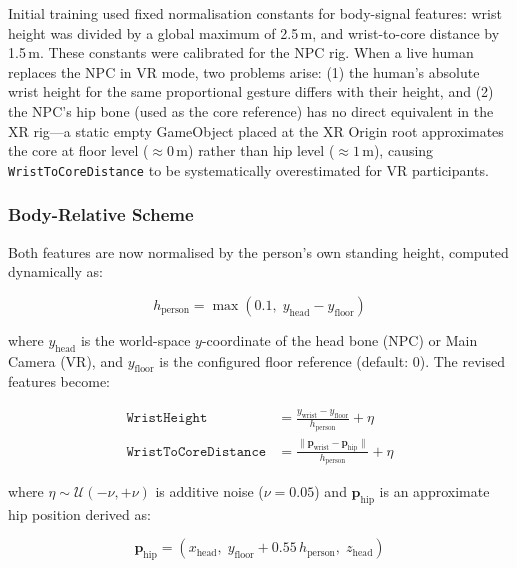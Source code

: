 \documentclass[../report.tex]{subfiles}
\begin{document}
    Initial training used fixed normalisation constants for body-signal features: wrist height was divided by a global maximum of 2.5\,m, and wrist-to-core distance by 1.5\,m. These constants were calibrated for the NPC rig. When a live human replaces the NPC in VR mode, two problems arise: (1) the human's absolute wrist height for the same proportional gesture differs with their height, and (2) the NPC's hip bone (used as the core reference) has no direct equivalent in the XR rig—a static empty GameObject placed at the XR Origin root approximates the core at floor level ($\approx 0$\,m) rather than hip level ($\approx 1$\,m), causing \texttt{WristToCoreDistance} to be systematically overestimated for VR participants.

    \subsubsection{Body-Relative Scheme}

    Both features are now normalised by the person's own standing height, computed dynamically as:

    \begin{equation}
        h_{\text{person}} = \max(0.1,\; y_{\text{head}} - y_{\text{floor}})
        \label{eq:personheight}
    \end{equation}

    where $y_{\text{head}}$ is the world-space $y$-coordinate of the head bone (NPC) or Main Camera (VR), and $y_{\text{floor}}$ is the configured floor reference (default: 0). The revised features become:

    \begin{align}
        \texttt{WristHeight} &= \frac{y_{\text{wrist}} - y_{\text{floor}}}{h_{\text{person}}} + \eta \label{eq:wristheight} \\[4pt]
        \texttt{WristToCoreDistance} &= \frac{\|\mathbf{p}_{\text{wrist}} - \mathbf{p}_{\text{hip}}\|}{h_{\text{person}}} + \eta \label{eq:wristcore}
    \end{align}

    where $\eta \sim \mathcal{U}(-\nu, +\nu)$ is additive noise ($\nu = 0.05$) and $\mathbf{p}_{\text{hip}}$ is an approximate hip position derived as:

    \begin{equation}
        \mathbf{p}_{\text{hip}} = \left(x_{\text{head}},\; y_{\text{floor}} + 0.55\, h_{\text{person}},\; z_{\text{head}}\right)
        \label{eq:hipapprox}
    \end{equation}
\end{document}
